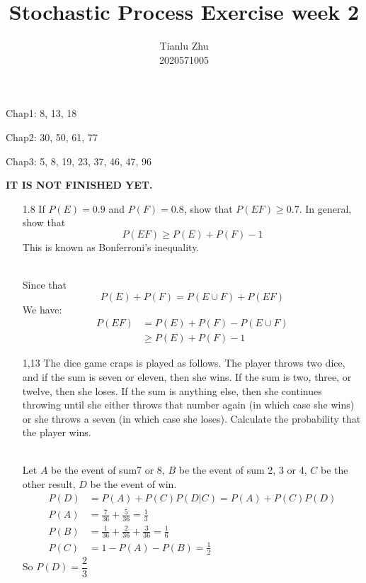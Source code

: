 \documentclass[en,hazy,blue,12pt,device = normal]{elegantnote}
\title{Stochastic Process Exercise week 2}
\author{Tianlu Zhu \\ 2020571005}
\date{}
\begin{document}
\maketitle
Chap1: 8, 13, 18

   Chap2: 30, 50, 61, 77

   Chap3: 5, 8, 19, 23, 37, 46, 47, 96

\textbf{IT IS NOT FINISHED YET.}
\begin{enumerate}
    \item[1.8] If $P(E)=0.9$ and $P(F)=0.8$, show that $P(E F) \geq 0.7$. In general, show that
    $$
    P(E F) \geq P(E)+P(F)-1
    $$
    This is known as Bonferroni's inequality.
    \begin{tcolorbox}
        \sol\\
        Since that \[P(E) + P(F) = P(E\cup F) + P(EF)\]
        We have:
        \begin{align*}
            P(EF)&=P(E) + P(F) - P(E\cup F)\\
            &\geq P(E) + P(F) - 1
        \end{align*}
    \end{tcolorbox}

    \item[1,13] The dice game craps is played as follows. The player throws two dice, and if the sum is seven or eleven, then she wins. If the sum is two, three, or twelve, then she loses. If the sum is anything else, then she continues throwing until she either throws that number again (in which case she wins) or she throws a seven (in which case she loses). Calculate the probability that the player wins.
    \begin{tcolorbox}
        \sol \\
        Let \(A\) be the event of sum7 or 8, \(B\) be the event of sum 2, 3 or 4, \(C\) be the other result, \(D\) be the event of win.
        \begin{align*}
            P(D) &= P(A) + P(C) P(D|C) = P(A) + P(C)P(D)\\
            P(A) &= \frac{7}{36} + \frac{5}{36} = \frac{1}{3}\\
            P(B) &= \frac{1}{36} + \frac{2}{36} + \frac{3}{36} = \frac{1}{6}\\
            P(C) &= 1-P(A)-P(B) = \frac{1}{2}
        \end{align*}
        So \(P(D) = \dfrac{2}{3}\)





\end{tcolorbox}
\end{enumerate}
\end{document}
